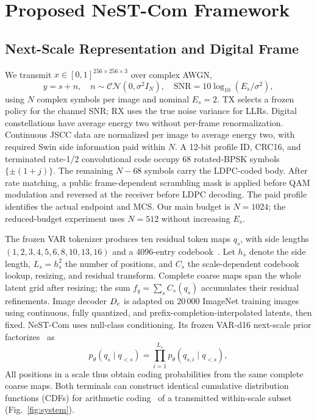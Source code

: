 \section{Proposed NeST-Com Framework}
\subsection{Next-Scale Representation and Digital Frame}
We transmit $x\in[0,1]^{256\times256\times3}$ over complex AWGN,
\begin{equation}
 y=s+n,\quad n\sim\mathcal{CN}(0,\sigma^2 I_N),\quad
 \mathrm{SNR}=10\log_{10}(E_s/\sigma^2),
 \label{eq:channel}
\end{equation}
using $N$ complex symbols per image and nominal $E_s=2$. TX selects a frozen policy for the channel SNR; RX uses the true noise variance for LLRs. Digital constellations have average energy two without per-frame renormalization. Continuous JSCC data are normalized per image to average energy two, with required Swin side information paid within $N$. A 12-bit profile ID, CRC16, and terminated rate-1/2 convolutional code occupy 68 rotated-BPSK symbols $\{\pm(1+j)\}$. The remaining $N-68$ symbols carry the LDPC-coded body. After rate matching, a public frame-dependent scrambling mask is applied before QAM modulation and reversed at the receiver before LDPC decoding. The paid profile identifies the actual endpoint and MCS. Our main budget is $N=1024$; the reduced-budget experiment uses $N=512$ without increasing $E_s$.

The frozen VAR tokenizer produces ten residual token maps $q_s$, with side lengths $(1,2,3,4,5,6,8,10,13,16)$ and a 4096-entry codebook~\cite{var}. Let $h_s$ denote the side length, $L_s=h_s^2$ the number of positions, and $C_s$ the scale-dependent codebook lookup, resizing, and residual transform. Complete coarse maps span the whole latent grid after resizing; the sum $f_q=\sum_s C_s(q_s)$ accumulates their residual refinements. Image decoder $D_c$ is adapted on 20\,000 ImageNet training images using continuous, fully quantized, and prefix-completion-interpolated latents, then fixed. NeST-Com uses null-class conditioning. Its frozen VAR-d16 next-scale prior factorizes~\cite{var} as
\begin{equation}
 p_\theta(q_s\mid q_{<s})=\prod_{i=1}^{L_s}p_\theta(q_{s,i}\mid q_{<s}),
 \label{eq:prior}
\end{equation}
All positions in a scale thus obtain coding probabilities from the same complete coarse maps. Both terminals can construct identical cumulative distribution functions (CDFs) for arithmetic coding~\cite{arithmetic} of a transmitted within-scale subset (Fig.~\ref{fig:system}).

